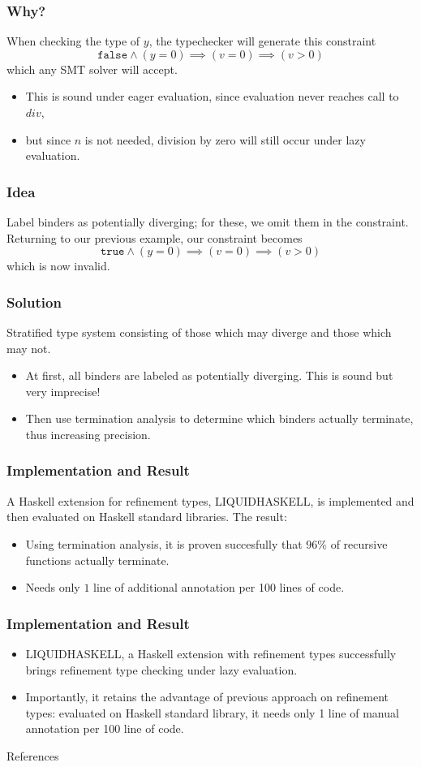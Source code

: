 \documentclass[pdf]{beamer}
\begin{document}
\begin{frame}
  \frametitle{Why?}
  When checking the type of $y$, the typechecker will generate this constraint
  $$\mathtt{false}\wedge(y=0)\implies(v=0)\implies(v>0)$$
  which any SMT solver will accept.
  \begin{itemize}
    \item This is sound under eager evaluation, since evaluation never reaches call to $div$,
    \item but since $n$ is not needed, division by zero will still occur under lazy evaluation.
  \end{itemize}
\end{frame}

\begin{frame}
  \frametitle{Idea}
  Label binders as potentially diverging; for these, we omit them in the
  constraint.  Returning to our previous example, our constraint becomes
  $$\mathtt{true}\wedge(y=0)\implies(v=0)\implies(v>0)$$
  which is now invalid.
\end{frame}

\begin{frame}
  \frametitle{Solution}
  Stratified type system consisting of those which may diverge and those which
  may not.
  \begin{itemize}
    \item At first, all binders are labeled as potentially diverging.  This is
      sound but very imprecise!
    \item Then use termination analysis to determine which binders actually
      terminate, thus increasing precision.
  \end{itemize}
\end{frame}

\begin{frame}
  \frametitle{Implementation and Result}
  A Haskell extension for refinement types, LIQUIDHASKELL, is implemented and
  then evaluated on Haskell standard libraries.  The result:
  \begin{itemize}
    \item Using termination analysis, it is proven succesfully that $96\%$ of
      recursive functions actually terminate.
    \item Needs only $1$ line of additional annotation per 100 lines of code.
  \end{itemize}
\end{frame}

\begin{frame}
  \frametitle{Implementation and Result}
  \begin{itemize}
    \item LIQUIDHASKELL, a Haskell extension with refinement types successfully
      brings refinement type checking under lazy evaluation.  
    \item Importantly, it retains the advantage of previous approach on
      refinement types: evaluated on Haskell standard library, it needs only 1
      line of manual annotation per 100 line of code.
  \end{itemize}
\end{frame}

\begin{frame}{References}
  
  
  \nocite{Rondon:2008:LT,Xi:1998:EAB,DBLP:conf/focs/HopcroftPV75}
\end{frame}
\end{document}

